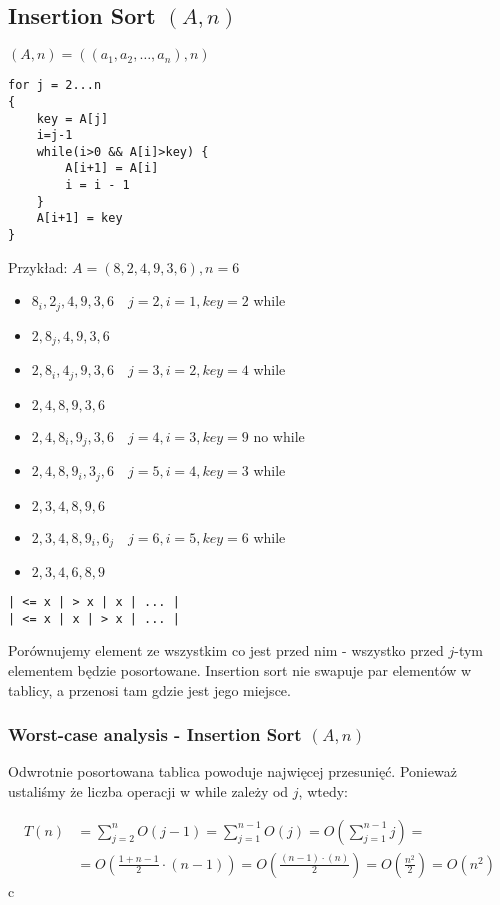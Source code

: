 \documentclass{article}
\begin{document}
\subsection{Insertion Sort $(A,n)$}

$(A,n) = ((a_1,a_2,\dots, a_n),n)$

\begin{verbatim}
for j = 2...n
{
    key = A[j]
    i=j-1
    while(i>0 && A[i]>key) {
        A[i+1] = A[i]
        i = i - 1
    }
    A[i+1] = key
}
\end{verbatim}

\noindent
Przykład: $A=(8, 2, 4, 9, 3, 6), n = 6$

\begin{itemize}
    \item $8_i, 2_j, 4, 9, 3, 6 \quad j=2, i=1, key = 2$ while
    \item $2, 8_j, 4, 9, 3, 6$
    \item $2, 8_i, 4_j, 9, 3, 6 \quad j=3, i=2, key = 4$ while
    \item $2, 4, 8, 9, 3, 6$
    \item $2, 4, 8_i, 9_j, 3, 6 \quad j=4, i=3, key = 9$ no while
    \item $2, 4, 8, 9_i, 3_j, 6 \quad j=5, i=4, key = 3$ while
    \item $2, 3, 4, 8, 9, 6$
    \item $2, 3, 4, 8, 9_i ,6_j \quad j=6, i=5, key = 6$ while
    \item $2, 3, 4, 6, 8, 9$
\end{itemize}

\begin{verbatim}
| <= x | > x | x | ... |
| <= x | x | > x | ... |
\end{verbatim}

\noindent
Porównujemy element ze wszystkim co jest przed nim - wszystko przed $j$-tym elementem będzie posortowane. Insertion sort nie swapuje par elementów w tablicy, a przenosi tam gdzie jest jego miejsce.

\subsubsection{Worst-case analysis - Insertion Sort $(A,n)$}

Odwrotnie posortowana tablica powoduje najwięcej przesunięć. Ponieważ ustaliśmy że liczba operacji w while zależy od $j$, wtedy:

\begin{align}
    T(n) &= \sum_{j=2}^n O(j-1) = \sum_{j=1}^{n-1} O(j) = O\left(\sum_{j=1}^{n-1} j\right) =\\
    &= O\left(\frac{1+n-1}{2}\cdot (n-1)\right) = O\left(\frac{(n-1)\cdot(n)}{2}\right) = O\left(\frac{n^2}{2}\right) = O(n^2)
\end{align}
c
\end{document}
